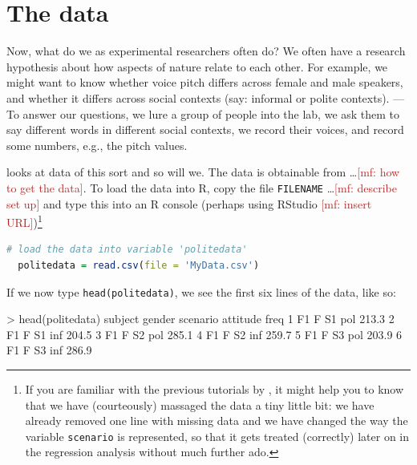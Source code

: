 \documentclass[fleqn,reqno,12pt]{article}
\renewcommand{\mf}[1]{\textcolor{firebrick}{[mf: #1]}}
\newcommand{\ri}[1]{\lstinline{#1}}  %
\begin{document}
\section{The data}
\label{sec:data}

Now, what do we as experimental researchers often do? We often have a research hypothesis about how aspects of nature relate to each other. For example, we might want to know whether voice pitch differs across female and male speakers, and whether it differs across social contexts (say: informal or polite contexts). --- To answer our questions, we lure a group of people into the lab, we ask them to say different words in different social contexts, we record their voices, and record some numbers, e.g., the pitch values.

\citet{Winter2013:Linear-models-a} looks at data of this sort \citep[taken from][]{WinterGrawunder2012:The-Phonetic-Pr} and so will we. The data is obtainable from \dots \mf{how to get the data}. To load the data into R, copy the file \texttt{FILENAME} \dots \mf{describe set up} and type this into an R console (perhaps using
RStudio \mf{insert URL})\footnote{If you are familiar with the previous tutorials by \citet{Winter2013:Linear-models-a}, it might help you to know that we have (courteously) massaged the data a tiny little bit: we have already removed one line with missing data and we have changed the way the variable
\texttt{scenario} is represented, so that it gets treated (correctly) later on in the regression analysis without much further ado.}

\medskip

\begin{lstlisting}[language=R]
  # load the data into variable 'politedata'
  politedata = read.csv(file = 'MyData.csv')     
\end{lstlisting}

\vspace*{-0.5cm}

\noindent If we now type \ri{head(politedata)}, we see the first six lines of the data, like so:

\medskip


\begin{rc}
> head(politedata)
  subject gender scenario attitude  freq
1      F1      F       S1      pol 213.3
2      F1      F       S1      inf 204.5
3      F1      F       S2      pol 285.1
4      F1      F       S2      inf 259.7
5      F1      F       S3      pol 203.9
6      F1      F       S3      inf 286.9
\end{rc}
\end{document}
